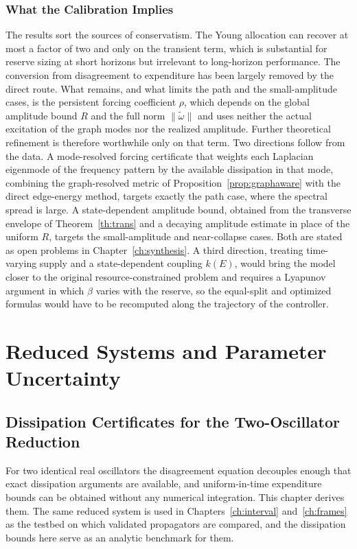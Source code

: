 \documentclass[11pt,notitlepage]{report}
\theoremstyle{definition}
\theoremstyle{remark}
\begin{document}
\section{What the Calibration Implies}
The results sort the sources of conservatism. The Young allocation can recover at most a factor of two and only on the transient term, which is substantial for reserve sizing at short horizons but irrelevant to long-horizon performance. The conversion from disagreement to expenditure has been largely removed by the direct route. What remains, and what limits the path and the small-amplitude cases, is the persistent forcing coefficient $\rho$, which depends on the global amplitude bound $R$ and the full norm $\|\tilde\omega\|$ and uses neither the actual excitation of the graph modes nor the realized amplitude. Further theoretical refinement is therefore worthwhile only on that term. Two directions follow from the data. A mode-resolved forcing certificate that weights each Laplacian eigenmode of the frequency pattern by the available dissipation in that mode, combining the graph-resolved metric of Proposition~\ref{prop:graphaware} with the direct edge-energy method, targets exactly the path case, where the spectral spread is large. A state-dependent amplitude bound, obtained from the transverse envelope of Theorem~\ref{th:trans} and a decaying amplitude estimate in place of the uniform $R$, targets the small-amplitude and near-collapse cases. Both are stated as open problems in Chapter~\ref{ch:synthesis}. A third direction, treating time-varying supply and a state-dependent coupling $k(E)$, would bring the model closer to the original resource-constrained problem and requires a Lyapunov argument in which $\beta$ varies with the reserve, so the equal-split and optimized formulas would have to be recomputed along the trajectory of the controller.
\part{Reduced Systems and Parameter Uncertainty}

\chapter{Dissipation Certificates for the Two-Oscillator Reduction}\label{ch:reduced}

For two identical real oscillators the disagreement equation decouples enough that exact dissipation arguments are available, and uniform-in-time expenditure bounds can be obtained without any numerical integration. This chapter derives them. The same reduced system is used in Chapters~\ref{ch:interval} and~\ref{ch:frames} as the testbed on which validated propagators are compared, and the dissipation bounds here serve as an analytic benchmark for them.
\end{document}
